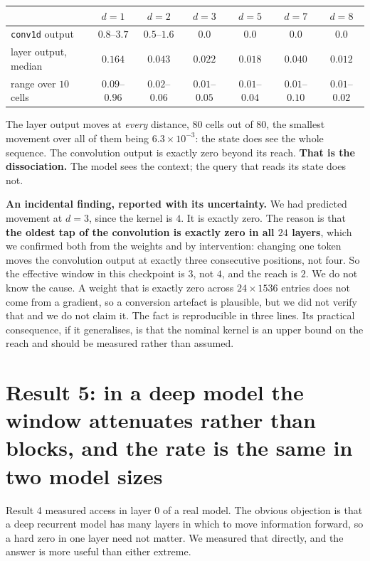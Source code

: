 \documentclass[11pt,a4paper]{article}
\begin{document}
\begin{center}
\begin{tabular}{lcccccc}
\toprule
& $d{=}1$ & $d{=}2$ & $d{=}3$ & $d{=}5$ & $d{=}7$ & $d{=}8$ \\
\midrule
\texttt{conv1d} output & $0.8$--$3.7$ & $0.5$--$1.6$ & $\mathbf{0.0}$ & $\mathbf{0.0}$ & $\mathbf{0.0}$ & $\mathbf{0.0}$ \\
layer output, median & $0.164$ & $0.043$ & $0.022$ & $0.018$ & $0.040$ & $0.012$ \\
\quad range over $10$ cells & $0.09$--$0.96$ & $0.02$--$0.06$ & $0.01$--$0.05$ & $0.01$--$0.04$ & $0.01$--$0.10$ & $0.01$--$0.02$ \\
\bottomrule
\end{tabular}
\end{center}

The layer output moves at \emph{every} distance, $80$ cells out of $80$, the smallest movement over
all of them being $6.3\!\times\!10^{-3}$: the state does see the whole sequence. The convolution output is exactly zero beyond its reach. \textbf{That is the dissociation.}
The model sees the context; the query that reads its state does not.

\textbf{An incidental finding, reported with its uncertainty.} We had predicted movement at $d=3$,
since the kernel is $4$. It is exactly zero. The reason is that \textbf{the oldest tap of the
convolution is exactly zero in all $24$ layers}, which we confirmed both from the weights and by
intervention: changing one token moves the convolution output at exactly three consecutive positions,
not four. So the effective window in this checkpoint is $3$, not $4$, and the reach is $2$. We do not
know the cause. A weight that is exactly zero across $24 \times 1536$ entries does not come from a
gradient, so a conversion artefact is plausible, but we did not verify that and we do not claim it.
The fact is reproducible in three lines. Its practical consequence, if it generalises, is that the
nominal kernel is an upper bound on the reach and should be measured rather than assumed.

\section{Result 5: in a deep model the window attenuates rather than blocks, and the rate is the same in two model sizes}

Result 4 measured access in layer $0$ of a real model. The obvious objection is that a deep recurrent
model has many layers in which to move information forward, so a hard zero in one layer need not
matter. We measured that directly, and the answer is more useful than either extreme.
\end{document}
